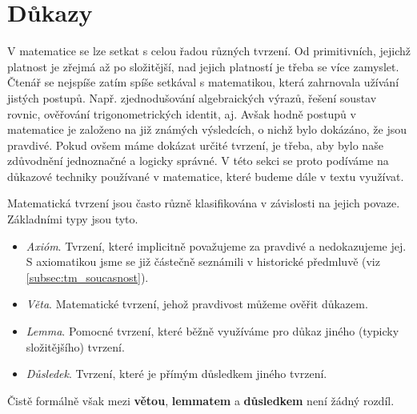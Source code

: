 \section{Důkazy}\label{sec:dukazy}
V matematice se lze setkat s celou řadou různých tvrzení. Od primitivních, jejichž platnost je zřejmá až po složitější, nad jejich platností je třeba se více zamyslet. Čtenář se nejspíše zatím spíše setkával s matematikou, která zahrnovala užívání jistých postupů. Např. zjednodušování algebraických výrazů, řešení soustav rovnic, ověřování trigonometrických identit, aj. Avšak hodně postupů v matematice je založeno na již známých výsledcích, o nichž bylo dokázáno, že jsou pravdivé. Pokud ovšem máme dokázat určité tvrzení, je třeba, aby bylo naše zdůvodnění jednoznačné a logicky správné. V této sekci se proto podíváme na důkazové techniky používané v matematice, které budeme dále v textu využívat.\par
Matematická tvrzení jsou často různě klasifikována v závislosti na jejich povaze. Základními typy jsou tyto. 
\begin{itemize}
    \item \emph{Axióm}. Tvrzení, které implicitně považujeme za pravdivé a nedokazujeme jej. S axiomatikou jsme se již částečně seznámili v historické předmluvě (viz \ref{subsec:tm_soucasnost}).
    \item \emph{Věta}. Matematické tvrzení, jehož pravdivost můžeme ověřit důkazem.
    \item \emph{Lemma}. Pomocné tvrzení, které běžně využíváme pro důkaz jiného (typicky složitějšího) tvrzení.
    \item \emph{Důsledek}. Tvrzení, které je přímým důsledkem jiného tvrzení.
\end{itemize}
Čistě formálně však mezi \textbf{větou}, \textbf{lemmatem} a \textbf{důsledkem} není žádný rozdíl.


